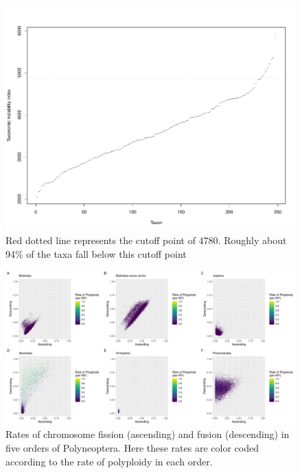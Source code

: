 \newpage
\begin{figure}
\centering \includegraphics[width=.5\textwidth]{figures/taxonomic_instability_index_plot.pdf}
\caption{
Red dotted line represents the cutoff point of 4780. Roughly about 94\% of the taxa fall below this cutoff point
}
\label{fig:tax.index}
\end{figure}

\newpage
\begin{figure}
\centering \includegraphics[width=1\textwidth]{figures/rate_distributions_fixed_scale.pdf}
\caption{
Rates of chromosome fission (ascending) and fusion (descending) in five orders of Polyneoptera. Here these rates are color coded according to the rate of polyploidy in each order. 
}
\label{fig:rates}
\end{figure}

